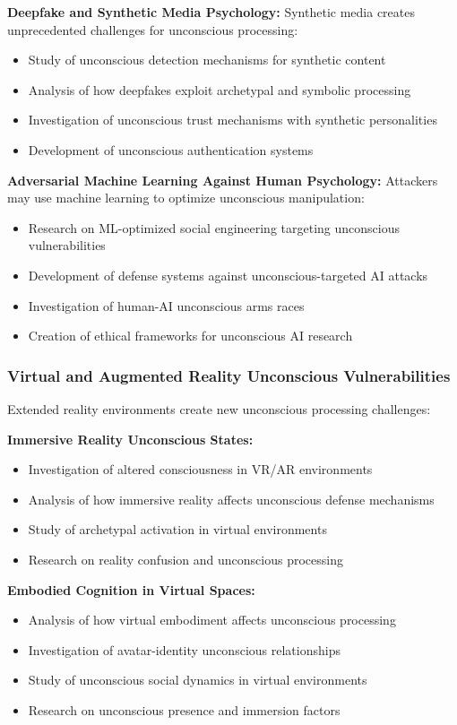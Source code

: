 \documentclass[11pt,a4paper]{article}
\begin{document}
\textbf{Deepfake and Synthetic Media Psychology:}
Synthetic media creates unprecedented challenges for unconscious processing:
\begin{itemize}
\item Study of unconscious detection mechanisms for synthetic content
\item Analysis of how deepfakes exploit archetypal and symbolic processing
\item Investigation of unconscious trust mechanisms with synthetic personalities
\item Development of unconscious authentication systems
\end{itemize}

\textbf{Adversarial Machine Learning Against Human Psychology:}
Attackers may use machine learning to optimize unconscious manipulation:
\begin{itemize}
\item Research on ML-optimized social engineering targeting unconscious vulnerabilities
\item Development of defense systems against unconscious-targeted AI attacks
\item Investigation of human-AI unconscious arms races
\item Creation of ethical frameworks for unconscious AI research
\end{itemize}

\subsubsection{Virtual and Augmented Reality Unconscious Vulnerabilities}

Extended reality environments create new unconscious processing challenges:

\textbf{Immersive Reality Unconscious States:}
\begin{itemize}
\item Investigation of altered consciousness in VR/AR environments
\item Analysis of how immersive reality affects unconscious defense mechanisms
\item Study of archetypal activation in virtual environments
\item Research on reality confusion and unconscious processing
\end{itemize}

\textbf{Embodied Cognition in Virtual Spaces:}
\begin{itemize}
\item Analysis of how virtual embodiment affects unconscious processing
\item Investigation of avatar-identity unconscious relationships
\item Study of unconscious social dynamics in virtual environments
\item Research on unconscious presence and immersion factors
\end{itemize}
\end{document}
